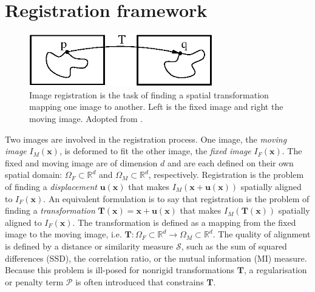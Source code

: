 \documentclass[]{report}
\newcommand{\vx}{\bm{x}}
\newcommand{\vux}{\bm{u}(\bm{x})}
\newcommand{\vT}{\bm{T}}
\newcommand{\Sim}{\mathcal{S}}
\newcommand{\Pen}{\mathcal{P}}
\begin{document}
\section{Registration framework}\label{sec:framework}

\begin{figure}[tb]
\centering
\includegraphics[width=8cm]{ImageRegistrationConcept.eps}
\caption{Image registration is the task of finding a spatial
transformation mapping one image to another. Left is the fixed image
and right the moving image. Adopted from
\citet{ITKSoftwareGuideSecondEdition}.} \label{fig:concept}
\end{figure}

Two images are involved in the registration process. One image, the
\emph{moving image} $I_M(\vx)$, is deformed to fit the other image,
the \emph{fixed image} $I_F(\vx)$. The fixed and moving image are of
dimension $d$ and are each defined on their own spatial domain:
$\Omega_F \subset \mathbb{R}^d$ and $\Omega_M \subset \mathbb{R}^d$,
respectively. Registration is the problem of finding a
\emph{displacement} $\vux$ that makes $I_M(\vx + \vux)$ spatially
aligned to $I_F(\vx)$. An equivalent formulation is to say that
registration is the problem of finding a \emph{transformation}
$\vT(\vx) = \vx + \vux $ that makes $I_M(\vT(\vx))$ spatially
aligned to $I_F(\vx)$. The transformation is defined as a mapping
from the fixed image to the moving image, i.e. $\vT: \Omega_F
\subset \mathbb{R}^d \rightarrow \Omega_M \subset \mathbb{R}^d$. The
quality of alignment is defined by a distance or similarity measure
$\Sim$, such as the sum of squared differences (SSD), the
correlation ratio, or the mutual information (MI) measure. Because
this problem is ill-posed for nonrigid transformations $\vT$, a
regularisation or penalty term $\Pen$ is often introduced that
constrains $\vT$.
\end{document}
